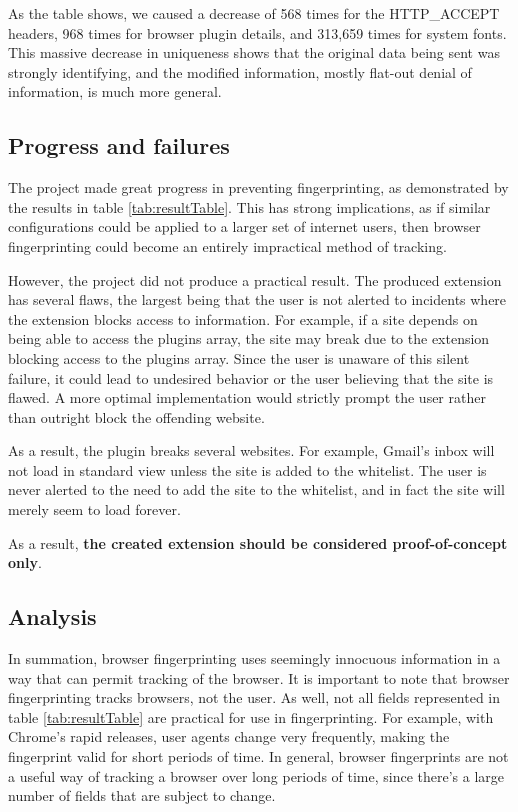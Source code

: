 \documentclass[12pt,a4paper]{article}
\begin{document}
As the table shows, we caused a decrease of 568 times for the HTTP\_ACCEPT headers, 968 times for browser plugin details, and 313,659 times for system fonts. This massive decrease in uniqueness shows that the original data being sent was strongly identifying, and the modified information, mostly flat-out denial of information, is much more general.

\subsection{Progress and failures}
The project made great progress in preventing fingerprinting, as demonstrated by the results in table \ref{tab:resultTable}. This has strong implications, as if similar configurations could be applied to a larger set of internet users, then browser fingerprinting could become an entirely impractical method of tracking.

However, the project did not produce a practical result. The produced extension has several flaws, the largest being that the user is not alerted to incidents where the extension blocks access to information. For example, if a site depends on being able to access the plugins array, the site may break due to the extension blocking access to the plugins array. Since the user is unaware of this silent failure, it could lead to undesired behavior or the user believing that the site is flawed. A more optimal implementation would strictly prompt the user rather than outright block the offending website.

As a result, the plugin breaks several websites. For example, Gmail's inbox will not load in standard view unless the site is added to the whitelist. The user is never alerted to the need to add the site to the whitelist, and in fact the site will merely seem to load forever.

As a result, \textbf{the created extension should be considered proof-of-concept only}.

\subsection{Analysis}
In summation, browser fingerprinting uses seemingly innocuous information in a way that can permit tracking of the browser. It is important to note that browser fingerprinting tracks browsers, not the user. As well, not all fields represented in table \ref{tab:resultTable} are practical for use in fingerprinting. For example, with Chrome's rapid releases, user agents change very frequently, making the fingerprint valid for short periods of time. In general, browser fingerprints are not a useful way of tracking a browser over long periods of time, since there's a large number of fields that are subject to change.
\end{document}
